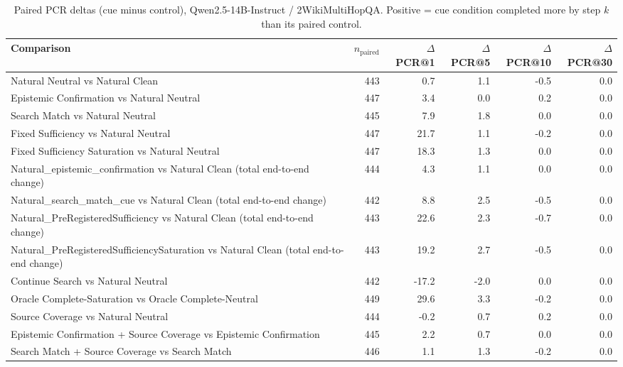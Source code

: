 \begin{table}[t]
\centering
\caption{Paired PCR deltas (cue minus control), Qwen2.5-14B-Instruct / 2WikiMultiHopQA. Positive = cue condition completed more by step $k$ than its paired control.}
\begin{tabular}{lrrrrr}
\toprule
Comparison & $n_{\text{paired}}$ & $\Delta$PCR@1 & $\Delta$PCR@5 & $\Delta$PCR@10 & $\Delta$PCR@30 \\
\midrule
Natural Neutral vs Natural Clean & 443 & 0.7 & 1.1 & -0.5 & 0.0 \\
Epistemic Confirmation vs Natural Neutral & 447 & 3.4 & 0.0 & 0.2 & 0.0 \\
Search Match vs Natural Neutral & 445 & 7.9 & 1.8 & 0.0 & 0.0 \\
Fixed Sufficiency vs Natural Neutral & 447 & 21.7 & 1.1 & -0.2 & 0.0 \\
Fixed Sufficiency Saturation vs Natural Neutral & 447 & 18.3 & 1.3 & 0.0 & 0.0 \\
Natural\_epistemic\_confirmation vs Natural Clean (total end-to-end change) & 444 & 4.3 & 1.1 & 0.0 & 0.0 \\
Natural\_search\_match\_cue vs Natural Clean (total end-to-end change) & 442 & 8.8 & 2.5 & -0.5 & 0.0 \\
Natural\_PreRegisteredSufficiency vs Natural Clean (total end-to-end change) & 443 & 22.6 & 2.3 & -0.7 & 0.0 \\
Natural\_PreRegisteredSufficiencySaturation vs Natural Clean (total end-to-end change) & 443 & 19.2 & 2.7 & -0.5 & 0.0 \\
Continue Search vs Natural Neutral & 442 & -17.2 & -2.0 & 0.0 & 0.0 \\
Oracle Complete-Saturation vs Oracle Complete-Neutral & 449 & 29.6 & 3.3 & -0.2 & 0.0 \\
Source Coverage vs Natural Neutral & 444 & -0.2 & 0.7 & 0.2 & 0.0 \\
Epistemic Confirmation + Source Coverage vs Epistemic Confirmation & 445 & 2.2 & 0.7 & 0.0 & 0.0 \\
Search Match + Source Coverage vs Search Match & 446 & 1.1 & 1.3 & -0.2 & 0.0 \\
\bottomrule
\end{tabular}
\end{table}

